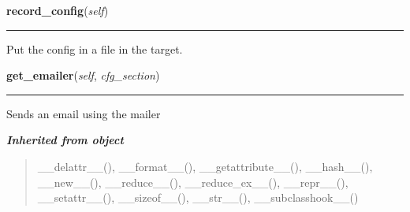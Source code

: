     \label{shutit_global:ShutIt:record_config}

    \vspace{0.5ex}

\hspace{.8\funcindent}\begin{boxedminipage}{\funcwidth}

    \raggedright \textbf{record\_config}(\textit{self})

    \vspace{-1.5ex}

    \rule{\textwidth}{0.5\fboxrule}
\setlength{\parskip}{2ex}
    Put the config in a file in the target.

\setlength{\parskip}{1ex}
    \end{boxedminipage}

    \label{shutit_global:ShutIt:get_emailer}

    \vspace{0.5ex}

\hspace{.8\funcindent}\begin{boxedminipage}{\funcwidth}

    \raggedright \textbf{get\_emailer}(\textit{self}, \textit{cfg\_section})

    \vspace{-1.5ex}

    \rule{\textwidth}{0.5\fboxrule}
\setlength{\parskip}{2ex}
    Sends an email using the mailer

\setlength{\parskip}{1ex}
    \end{boxedminipage}


\large{\textbf{\textit{Inherited from object}}}

\begin{quote}
\_\_delattr\_\_(), \_\_format\_\_(), \_\_getattribute\_\_(), \_\_hash\_\_(), \_\_new\_\_(), \_\_reduce\_\_(), \_\_reduce\_ex\_\_(), \_\_repr\_\_(), \_\_setattr\_\_(), \_\_sizeof\_\_(), \_\_str\_\_(), \_\_subclasshook\_\_()
\end{quote}


